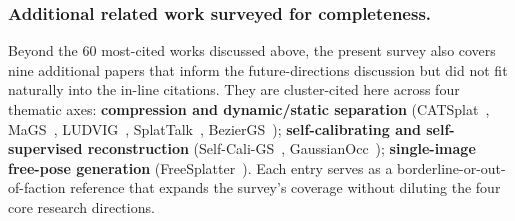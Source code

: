 \subsubsection{Additional related work surveyed for completeness.}
Beyond the 60 most-cited works discussed above, the present
survey also covers nine additional papers that inform the
future-directions discussion but did not fit naturally into
the in-line citations. They are cluster-cited here across
four thematic axes: \textbf{compression and dynamic/static
separation} (CATSplat~\cite{roh2025catsplat},
MaGS~\cite{ma2025mags}, LUDVIG~\cite{marrie2025ludvig},
SplatTalk~\cite{thai2025splattalk},
BezierGS~\cite{ma2025beziergs}); \textbf{self-calibrating
and self-supervised reconstruction}
(Self-Cali-GS~\cite{deng2025selfcalibratinggs},
GaussianOcc~\cite{gan2025gaussianocc}); \textbf{single-image
free-pose generation}
(FreeSplatter~\cite{xu2025freesplatter}). Each entry
serves as a borderline-or-out-of-faction reference that
expands the survey's coverage without diluting the four
core research directions.
